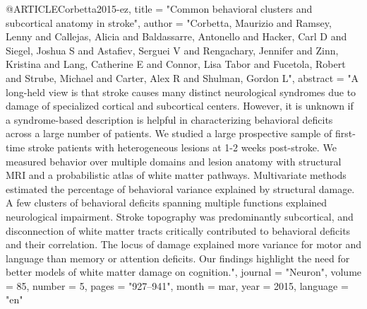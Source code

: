 @ARTICLE{Corbetta2015-ez,
	title    = "Common behavioral clusters and subcortical anatomy in stroke",
	author   = "Corbetta, Maurizio and Ramsey, Lenny and Callejas, Alicia and
	Baldassarre, Antonello and Hacker, Carl D and Siegel, Joshua S
	and Astafiev, Serguei V and Rengachary, Jennifer and Zinn,
	Kristina and Lang, Catherine E and Connor, Lisa Tabor and
	Fucetola, Robert and Strube, Michael and Carter, Alex R and
	Shulman, Gordon L",
	abstract = "A long-held view is that stroke causes many distinct neurological
	syndromes due to damage of specialized cortical and subcortical
	centers. However, it is unknown if a syndrome-based description
	is helpful in characterizing behavioral deficits across a large
	number of patients. We studied a large prospective sample of
	first-time stroke patients with heterogeneous lesions at 1-2
	weeks post-stroke. We measured behavior over multiple domains and
	lesion anatomy with structural MRI and a probabilistic atlas of
	white matter pathways. Multivariate methods estimated the
	percentage of behavioral variance explained by structural damage.
	A few clusters of behavioral deficits spanning multiple functions
	explained neurological impairment. Stroke topography was
	predominantly subcortical, and disconnection of white matter
	tracts critically contributed to behavioral deficits and their
	correlation. The locus of damage explained more variance for
	motor and language than memory or attention deficits. Our
	findings highlight the need for better models of white matter
	damage on cognition.",
	journal  = "Neuron",
	volume   =  85,
	number   =  5,
	pages    = "927--941",
	month    =  mar,
	year     =  2015,
	language = "en"
}

